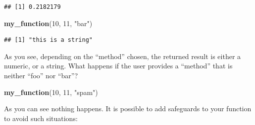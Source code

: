 \documentclass[]{gitbook}
\newenvironment{Shaded}{\begin{snugshade}}{\end{snugshade}}
\newcommand{\ControlFlowTok}[1]{\textcolor[rgb]{0.13,0.29,0.53}{\textbf{#1}}}
\newcommand{\DataTypeTok}[1]{\textcolor[rgb]{0.13,0.29,0.53}{#1}}
\newcommand{\DecValTok}[1]{\textcolor[rgb]{0.00,0.00,0.81}{#1}}
\newcommand{\KeywordTok}[1]{\textcolor[rgb]{0.13,0.29,0.53}{\textbf{#1}}}
\newcommand{\NormalTok}[1]{#1}
\newcommand{\OperatorTok}[1]{\textcolor[rgb]{0.81,0.36,0.00}{\textbf{#1}}}
\newcommand{\StringTok}[1]{\textcolor[rgb]{0.31,0.60,0.02}{#1}}
\begin{document}
\begin{verbatim}
## [1] 0.2182179
\end{verbatim}

\begin{Shaded}
\begin{Highlighting}[]
\KeywordTok{my_function}\NormalTok{(}\DecValTok{10}\NormalTok{, }\DecValTok{11}\NormalTok{, }\StringTok{"bar"}\NormalTok{)}
\end{Highlighting}
\end{Shaded}

\begin{verbatim}
## [1] "this is a string"
\end{verbatim}

As you see, depending on the ``method'' chosen, the returned result is either a numeric, or a string.
What happens if the user provides a ``method'' that is neither ``foo'' nor ``bar''?

\begin{Shaded}
\begin{Highlighting}[]
\KeywordTok{my_function}\NormalTok{(}\DecValTok{10}\NormalTok{, }\DecValTok{11}\NormalTok{, }\StringTok{"spam"}\NormalTok{)}
\end{Highlighting}
\end{Shaded}

As you can see nothing happens. It is possible to add safeguards to your function to avoid such
situations:

\begin{Shaded}
\end{Shaded}
\end{document}
